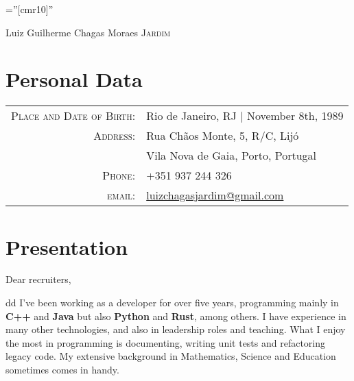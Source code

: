 \documentclass[a4paper,10pt]{article}
\newcommand{\cvtype}{d}
\begin{document}

\pagestyle{empty} %

\font\fb=''[cmr10]'' %

\par{\centering
		{\Huge Luiz Guilherme Chagas Moraes \textsc{Jardim}
	}\bigskip\par}

\section{Personal Data}

\begin{tabular}{rl}
    \textsc{Place and Date of Birth:} & Rio de Janeiro, RJ  | November 8th, 1989 \\
    \textsc{Address:}   & Rua Chãos Monte, 5, R/C, Lijó\\& Vila Nova de Gaia, Porto, Portugal \\
    \textsc{Phone:}     & +351 937 244 326\\
    \textsc{email:}     & \href{mailto:luizchagasjardim@gmail.com}{luizchagasjardim@gmail.com} \\
\end{tabular}

\section{Presentation}
Dear recruiters,

\if \cvtype d
{\quad}I've been working as a developer for over five years, programming mainly in \textbf{C++} and \textbf{Java} but also \textbf{Python} and \textbf{Rust}, among others. I have experience in many other technologies, and also in leadership roles and teaching. What I enjoy the most in programming is documenting, writing unit tests and refactoring legacy code. My extensive background in Mathematics, Science and Education sometimes comes in handy.
\end{document}
